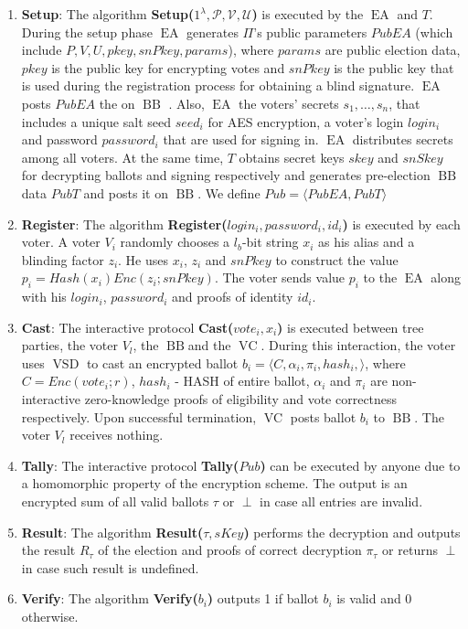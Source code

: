 \documentclass[12pt]{article}
\DeclareMathOperator{\vsd}{VSD}
\DeclareMathOperator{\ea}{EA}
\DeclareMathOperator{\bb}{BB}
\DeclareMathOperator{\voc}{VC}
\begin{document}
\begin{enumerate}
\item \textbf{Setup}: The algorithm \textbf{Setup($1^{\lambda}, \mathcal{P}, \mathcal{V}, \mathcal{U}$)}  is executed by the $\ea$ and $T$. During the setup phase $\ea$ generates $\Pi$'s public parameters $PubEA$ (which include $P, V, U, pkey, snPkey, params$), where $params$ are public election data, $pkey$ is the public key for encrypting votes and $snPkey$ is the public key that is used during the registration process for obtaining a blind signature. $\ea$ posts  $PubEA$  the on $\bb$ . Also, $\ea$ the voters' secrets $s_1, \dots , s_n$, that includes a unique salt seed $seed_i$ for AES encryption, a voter's login $login_i$ and password $password_i$ that are used for signing in. $\ea$ distributes secrets among all voters. At the same time, $T$  obtains secret keys $skey$ and $snSkey$ for decrypting ballots and signing respectively and generates pre-election $\bb$ data $PubT$ and posts it on $\bb$. We define $Pub = \langle PubEA, PubT \rangle $ 
\item  \textbf{Register}: The algorithm \textbf{Register($login_i,password_i,id_i$)}  is executed by each voter. A voter $V_i$ randomly chooses a $l_b$-bit string $x_i$ as his alias and a blinding factor $z_i$. He uses $x_i$, $z_i$ and $snPkey$ to construct the value $p_i = Hash(x_i)Enc(z_i;snPkey)$. The voter sends value $p_i$ to the $\ea$ along with his $login_i$, $password_i$ and proofs of identity $id_i$.
\item  \textbf{Cast}:  The interactive protocol \textbf{Cast($vote_i,x_i$)} is executed between tree parties, the voter $V_l$, the $\bb$and the $\voc$. During this interaction, the voter uses $\vsd$ to cast an encrypted ballot $b_i = \langle C, \alpha_i, \pi_i, hash_i, \rangle$, where $C=Enc(vote_i;r)$, $hash_i$ - HASH of entire ballot,  $\alpha_i$ and $\pi_i$  are non-interactive zero-knowledge proofs of eligibility and vote correctness respectively. Upon successful termination, $\voc$ posts ballot $b_i$ to $\bb$. The voter $V_l$ receives nothing.
\item  \textbf{Tally}: The interactive protocol \textbf{Tally($Pub$)}  can be executed by anyone due to a homomorphic property of the encryption scheme. The output is an encrypted sum of all valid ballots $\tau$ or $\perp$ in case all entries are invalid.
\item   \textbf{Result}: The algorithm  \textbf{Result($\tau, sKey$)} performs the decryption and outputs the result $R_{\tau}$ of the election and proofs of correct decryption $\pi_{\tau}$ or returns  $\perp$in case such result is undefined.
\item  \textbf{Verify}: The algorithm \textbf{Verify($b_i$)} outputs 1 if ballot $b_i$ is valid and 0 otherwise.
\end{enumerate}
\end{document}
